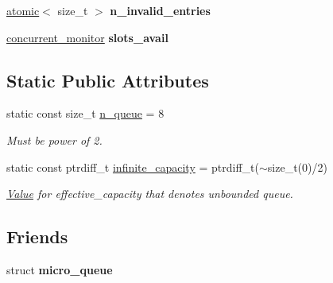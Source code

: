 \begin{DoxyCompactItemize}
\item 
\hypertarget{classtbb_1_1internal_1_1concurrent__queue__rep_ac6d1a308f4ab8138dafec71e5dbab230}{}\hyperlink{structtbb_1_1atomic}{atomic}$<$ size\+\_\+t $>$ {\bfseries n\+\_\+invalid\+\_\+entries}\label{classtbb_1_1internal_1_1concurrent__queue__rep_ac6d1a308f4ab8138dafec71e5dbab230}

\item 
\hypertarget{classtbb_1_1internal_1_1concurrent__queue__rep_a8c4f3493d9e8715a9de431dfed380e46}{}\hyperlink{classtbb_1_1internal_1_1concurrent__monitor}{concurrent\+\_\+monitor} {\bfseries slots\+\_\+avail}\label{classtbb_1_1internal_1_1concurrent__queue__rep_a8c4f3493d9e8715a9de431dfed380e46}

\end{DoxyCompactItemize}
\subsection*{Static Public Attributes}
\begin{DoxyCompactItemize}
\item 
\hypertarget{classtbb_1_1internal_1_1concurrent__queue__rep_a125288547cb8f625dd3eab221afb805c}{}static const size\+\_\+t \hyperlink{classtbb_1_1internal_1_1concurrent__queue__rep_a125288547cb8f625dd3eab221afb805c}{n\+\_\+queue} = 8\label{classtbb_1_1internal_1_1concurrent__queue__rep_a125288547cb8f625dd3eab221afb805c}

\begin{DoxyCompactList}\small\item\em Must be power of 2. \end{DoxyCompactList}\item 
\hypertarget{classtbb_1_1internal_1_1concurrent__queue__rep_a14abf0d3078a31c95e2d670d4ae8f192}{}static const ptrdiff\+\_\+t \hyperlink{classtbb_1_1internal_1_1concurrent__queue__rep_a14abf0d3078a31c95e2d670d4ae8f192}{infinite\+\_\+capacity} = ptrdiff\+\_\+t($\sim$size\+\_\+t(0)/2)\label{classtbb_1_1internal_1_1concurrent__queue__rep_a14abf0d3078a31c95e2d670d4ae8f192}

\begin{DoxyCompactList}\small\item\em \hyperlink{structValue}{Value} for effective\+\_\+capacity that denotes unbounded queue. \end{DoxyCompactList}\end{DoxyCompactItemize}
\subsection*{Friends}
\begin{DoxyCompactItemize}
\item 
\hypertarget{classtbb_1_1internal_1_1concurrent__queue__rep_a62f9ac6fd9e15be139d0925d4e8d5142}{}struct {\bfseries micro\+\_\+queue}\label{classtbb_1_1internal_1_1concurrent__queue__rep_a62f9ac6fd9e15be139d0925d4e8d5142}

\end{DoxyCompactItemize}


